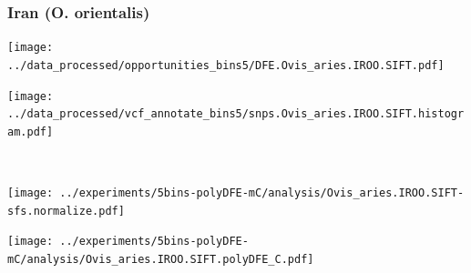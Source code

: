 \subsubsection{Iran (O. orientalis)}

\begin{minipage}{0.49\linewidth}
    \texttt{[image: ../data\_processed/opportunities\_bins5/DFE.Ovis\_aries.IROO.SIFT.pdf]}
\end{minipage}
\begin{minipage}{0.49\linewidth}
    \texttt{[image: ../data\_processed/vcf\_annotate\_bins5/snps.Ovis\_aries.IROO.SIFT.histogram.pdf]}
\end{minipage}
\\
\begin{minipage}{0.49\linewidth}
    \texttt{[image: ../experiments/5bins-polyDFE-mC/analysis/Ovis\_aries.IROO.SIFT-sfs.normalize.pdf]}
\end{minipage}
\begin{minipage}{0.4\linewidth}
    \texttt{[image: ../experiments/5bins-polyDFE-mC/analysis/Ovis\_aries.IROO.SIFT.polyDFE\_C.pdf]}
\end{minipage}
